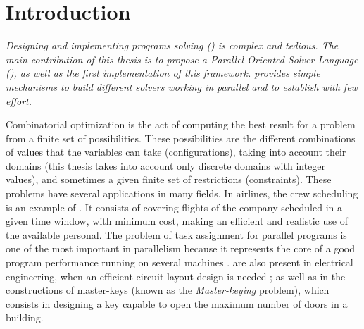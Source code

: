 \chapter{Introduction}
\label{chap:Intro}
\textit{Designing and implementing programs solving \CSPs{} (\csp) is complex and tedious. The main contribution of this thesis is to propose a Parallel-Oriented Solver Language (\posl), as well as the first implementation of this framework. \posl{} provides simple mechanisms to build different solvers working in parallel and to establish \commstrs{} with few effort.}
\vfill
\minitoc
\newpage

Combinatorial optimization is the act of computing the best result for a problem from a finite set of possibilities. These possibilities are the different combinations of values that the variables can take (configurations), taking into account their domains (this thesis takes into account only discrete domains with integer values), and sometimes a given finite set of restrictions (constraints). These problems have several applications in many fields. In airlines, the crew scheduling is an example of \COP. It consists of covering flights of the company scheduled in a given time window, with minimum cost, making an efficient and realistic use of the available personal. The problem of task assignment for parallel programs is one of the most important in parallelism because it represents the core of a good program performance running on several machines \cite{Paschos2013}. %
\COPs{} are also present in electrical engineering, when an efficient circuit layout design is needed \cite{Barahona1988}; as well as in the constructions of master-keys (known as the \textit{Master-keying} problem), which consists in designing a key capable to open the maximum number of doors in a building\cite{Espelage2000}.


